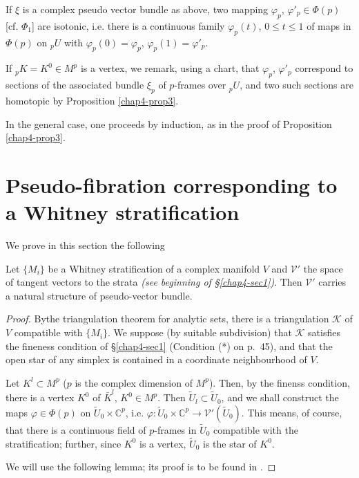\begin{remark*}
If $\xi$ is a complex pseudo vector bundle as above, two mapping
$\varphi_{p}$, $\varphi'_{p}\in\Phi(p)$ [cf. $\Phi_{1}$] are isotonic,
i.e. there is a continuous family $\varphi_{p}(t)$, $0\leq t\leq 1$ of
maps in $\Phi(p)$ on ${}_{p}U$ with $\varphi_{p}(0)=\varphi_{p}$,
$\varphi_{p}(1)=\varphi'_{p}$. 
\end{remark*}

If ${}_{p}K=K^{0}\in M^{p}$ is a vertex, we remark, using a chart,
that $\varphi_{p}$, $\varphi'_{p}$ correspond to sections of the
associated bundle $\xi_{p}$ of $p$-frames over ${}_{p}U$, and two such
sections are homotopic by Proposition \ref{chap4-prop3}.

In the general case, one proceeds by induction, as in the proof of
Proposition \ref{chap4-prop3}.

\section[Pseudo-fibration corresponding to a Whitney
  stratification]{Pseudo-fibration corresponding to a Whitney\hfill\break
  stratification}\label{chap4-sec4} 
 
We prove in this section the following
   
\begin{theorem*} %
Let $\{M_{i}\}$ be a Whitney stratification of a complex manifold $V$
and $\mathscr{V}'$ the space of tangent vectors to the strata {\em (see
  beginning of \S \ref{chap4-sec1})}. Then $\mathscr{V}'$ carries a
natural structure of pseudo-vector bundle.
\end{theorem*}
 
\begin{proof} %
By\pageoriginale the triangulation theorem for analytic sets, there is
a triangulation $\mathscr{K}$ of $V$ compatible with $\{M_{i}\}$. We
suppose (by suitable subdivision) that $\mathscr{K}$ satisfies the
fineness condition of \S \ref{chap4-sec1} (Condition (*) on p.~45),
and that the open star of any simplex is contained in a coordinate
neighbourhood of $V$.

Let $K^{l}\subset M^{p}$ ($p$ is the complex dimension of
$M^{p}$). Then, by the finenss condition, there is a vertex $K^{0}$ of
$\bar{K}^{l}$, $K^{0}\in M^{p}$. Then $\widetilde{U}_{l}\subset
\widetilde{U}_{0}$, and we shall construct the maps $\varphi\in
\Phi(p)$ on $\widetilde{U}_{0}\times\mathbb{C}^{p}$,
i.e. $\varphi:\widetilde{U}_{0}\times \mathbb{C}^{p}\to
\mathscr{V}'(\widetilde{U}_{0})$. This means, of course, that there is
a continuous field of $p$-frames in $\widetilde{U}_{0}$ compatible
with the stratification; further, since $K^{0}$ is a vertex,
$\widetilde{U}_{0}$ is the star of $K^{0}$. 

We will use the following lemma; its proof is to be found in
\cite{key5}. 
\end{proof}

